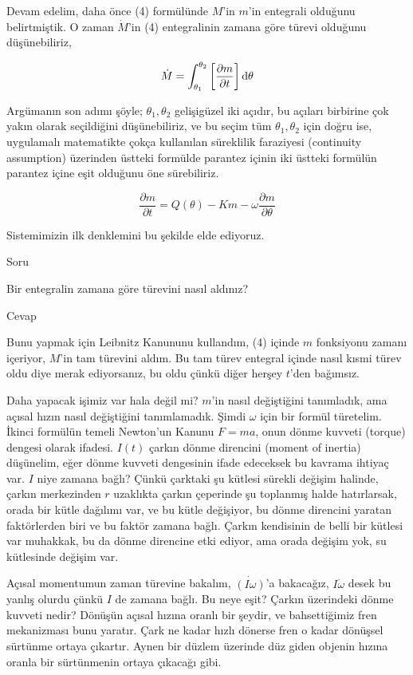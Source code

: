 \documentclass[12pt,fleqn]{article}\usepackage{../../common}
\begin{document}
Devam edelim, daha önce (4) formülünde $M$'in $m$'in entegrali olduğunu
belirtmiştik. O zaman $\dot{M}$'in (4) entegralinin zamana göre türevi
olduğunu düşünebiliriz,

$$ 
\dot{M} = \int _{\theta_1}^{\theta_2} \bigg[ \frac{\partial m}{\partial t} \bigg] \,\mathrm{d}\theta 
$$

Argümanın son adımı şöyle; $\theta_1,\theta_2$ gelişigüzel iki açıdır, bu
açıları birbirine çok yakın olarak seçildiğini düşünebiliriz, ve bu seçim
tüm $\theta_1,\theta_2$ için doğru ise, uygulamalı matematikte çokça
kullanılan süreklilik faraziyesi (continuity assumption) üzerinden üstteki
formülde parantez içinin iki üstteki formülün parantez içine eşit olduğunu
öne sürebiliriz.

$$ 
\frac{\partial m}{\partial t} = 
Q(\theta)  -  Km  - \omega \frac{\partial m}{\partial \theta}
$$

Sistemimizin ilk denklemini bu şekilde elde ediyoruz. 

Soru

Bir entegralin zamana göre türevini nasıl aldınız?

Cevap

Bunu yapmak için Leibnitz Kanununu kullandım, (4) içinde $m$ fonksiyonu
zamanı içeriyor, $M$'in tam türevini aldım. Bu tam türev entegral içinde
nasıl kısmi türev oldu diye merak ediyorsanız, bu oldu çünkü diğer herşey
$t$'den bağımsız. 

Daha yapacak işimiz var hala değil mi? $m$'in nasıl değiştiğini tanımladık,
ama açısal hızın nasıl değiştiğini tanımlamadık. Şimdi $\omega$ için bir
formül türetelim. İkinci formülün temeli Newton'un Kanunu $F = ma$, onun
dönme kuvveti (torque) dengesi olarak ifadesi. $I(t)$ çarkın dönme
direncini (moment of inertia) düşünelim, eğer dönme kuvveti dengesinin
ifade edeceksek bu kavrama ihtiyaç var. $I$ niye zamana bağlı? Çünkü
çarktaki şu kütlesi sürekli değişim halinde, çarkın merkezinden $r$
uzaklıkta çarkın çeperinde şu toplanmış halde hatırlarsak, orada bir kütle
dağılımı var, ve bu kütle değişiyor, bu dönme direncini yaratan
faktörlerden biri ve bu faktör zamana bağlı. Çarkın kendisinin de belli bir
kütlesi var muhakkak, bu da dönme direncine etki ediyor, ama orada değişim
yok, su kütlesinde değişim var.

Açısal momentumun zaman türevine bakalım, $\dot{(I \omega)}$'a bakacağız,
$I\dot{\omega}$ desek bu yanlış olurdu çünkü $I$ de zamana bağlı. Bu neye
eşit? Çarkın üzerindeki dönme kuvveti nedir? Dönüşün açısal hızına oranlı
bir şeydir, ve bahsettiğimiz fren mekanizması bunu yaratır. Çark ne kadar
hızlı dönerse fren o kadar dönüşsel sürtünme ortaya çıkartır. Aynen bir
düzlem üzerinde düz giden objenin hızına oranla bir sürtünmenin ortaya
çıkacağı gibi. 
\end{document}
